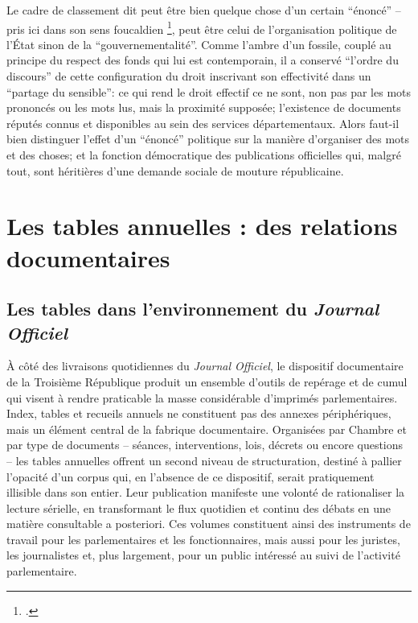 Le cadre de classement dit peut être bien quelque chose d’un certain \enquote{énoncé} -- pris ici dans son sens foucaldien \footcite[][]{foucault}, peut être celui de l’organisation politique de l’État sinon de la \enquote{gouvernementalité}. Comme l’ambre d’un fossile, couplé au principe du respect des fonds qui lui est contemporain, il a conservé \enquote{l’ordre du discours} de cette configuration du droit inscrivant son effectivité dans un \enquote{partage du sensible}: ce qui rend le droit effectif ce ne sont, non pas par les mots prononcés ou les mots lus, mais la proximité supposée; l’existence de documents réputés connus et disponibles au sein des services départementaux. Alors faut-il bien distinguer l’effet d’un \enquote{énoncé} politique sur la manière d’organiser des mots et des choses; et la fonction démocratique des publications officielles qui, malgré tout, sont héritières d’une demande sociale de mouture républicaine.

\chapter{Les tables annuelles : des relations documentaires}

\section{Les tables dans l’environnement du \emph{Journal Officiel}}

À côté des livraisons quotidiennes du \emph{Journal Officiel}, le dispositif documentaire de la Troisième République produit un ensemble d’outils de repérage et de cumul qui visent à rendre praticable la masse considérable d’imprimés parlementaires. Index, tables et recueils annuels ne constituent pas des annexes périphériques, mais un élément central de la fabrique documentaire. Organisées par Chambre et par type de documents – séances, interventions, lois, décrets ou encore questions – les tables annuelles offrent un second niveau de structuration, destiné à pallier l’opacité d’un corpus qui, en l’absence de ce dispositif, serait pratiquement illisible dans son entier. Leur publication manifeste une volonté de rationaliser la lecture sérielle, en transformant le flux quotidien et continu des débats en une matière consultable a posteriori. Ces volumes constituent ainsi des instruments de travail pour les parlementaires et les fonctionnaires, mais aussi pour les juristes, les journalistes et, plus largement, pour un public intéressé au suivi de l’activité parlementaire.

